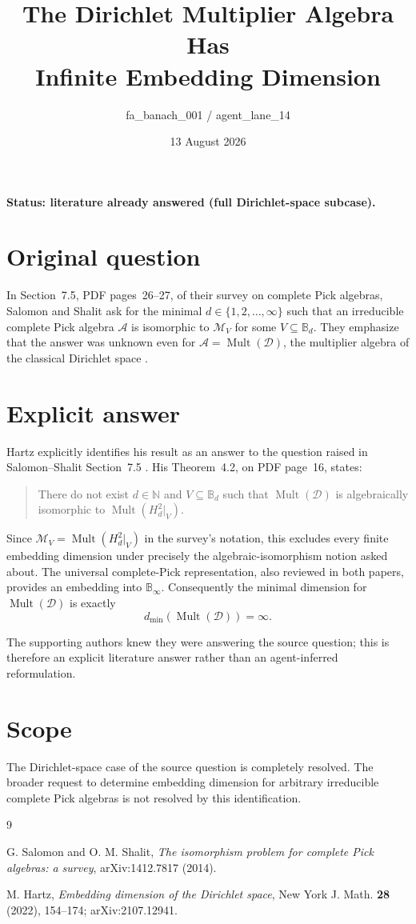 \documentclass[10pt]{article}
\title{The Dirichlet Multiplier Algebra Has\\
Infinite Embedding Dimension}
\author{fa\_banach\_001 / agent\_lane\_14}
\date{13 August 2026}
\newcommand{\Mult}{\operatorname{Mult}}
\newcommand{\D}{\mathcal D}
\newcommand{\B}{\mathbb B}
\begin{document}
\maketitle

\noindent\textbf{Status: literature already answered (full Dirichlet-space
subcase).}

\section*{Original question}

In Section~7.5, PDF pages~26--27, of their survey on complete Pick
algebras, Salomon and Shalit ask for the minimal
$d\in\{1,2,\ldots,\infty\}$ such that an irreducible complete Pick algebra
$\mathcal A$ is isomorphic to $\mathcal M_V$ for some
$V\subseteq\B_d$.  They emphasize that the answer was unknown even for
$\mathcal A=\Mult(\D)$, the multiplier algebra of the classical Dirichlet
space \cite{SS}.

\section*{Explicit answer}

Hartz explicitly identifies his result as an answer to the question raised
in Salomon--Shalit Section~7.5 \cite[p.~2]{Hartz}.  His Theorem~4.2, on PDF
page~16, states:
\begin{quote}
There do not exist $d\in\mathbb N$ and $V\subseteq\B_d$ such that
$\Mult(\D)$ is algebraically isomorphic to
$\Mult(H^2_d|_V)$.
\end{quote}
Since $\mathcal M_V=\Mult(H^2_d|_V)$ in the survey's notation, this excludes
every finite embedding dimension under precisely the algebraic-isomorphism
notion asked about.  The universal complete-Pick representation, also
reviewed in both papers, provides an embedding into $\B_\infty$.
Consequently the minimal dimension for $\Mult(\D)$ is exactly
\[
 d_{\min}(\Mult(\D))=\infty.
\]

The supporting authors knew they were answering the source question; this is
therefore an explicit literature answer rather than an agent-inferred
reformulation.

\section*{Scope}

The Dirichlet-space case of the source question is completely resolved.  The
broader request to determine embedding dimension for arbitrary irreducible
complete Pick algebras is not resolved by this identification.

\begin{thebibliography}{9}

G. Salomon and O. M. Shalit,
\emph{The isomorphism problem for complete Pick algebras: a survey},
arXiv:1412.7817 (2014).

M. Hartz,
\emph{Embedding dimension of the Dirichlet space},
New York J. Math. \textbf{28} (2022), 154--174;
arXiv:2107.12941.

\end{thebibliography}
\end{document}
